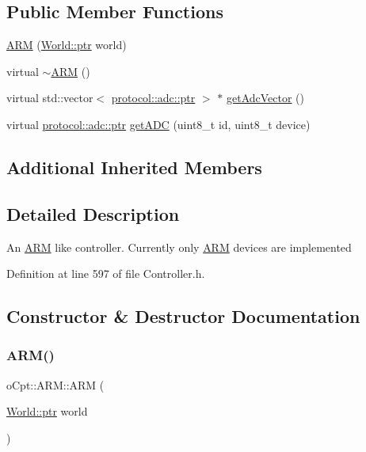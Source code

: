 \subsection*{Public Member Functions}
\begin{DoxyCompactItemize}
\item 
\hyperlink{classo_cpt_1_1_a_r_m_af99c9e575fbee98bf8754220d7a8badd}{A\+RM} (\hyperlink{classo_cpt_1_1_world_aa6e591e3096d5de71e0cec9039663d67}{World\+::ptr} world)
\item 
virtual \hyperlink{classo_cpt_1_1_a_r_m_a2be59dd26648e2a21c3996bcc3b2b153}{$\sim$\+A\+RM} ()
\item 
virtual std\+::vector$<$ \hyperlink{classo_cpt_1_1protocol_1_1adc_a94af68cb9c573629a4a1a16f8ebd3dff}{protocol\+::adc\+::ptr} $>$ $\ast$ \hyperlink{classo_cpt_1_1_a_r_m_a32e77e29e34f3114f0b766b705366ba8}{get\+Adc\+Vector} ()
\item 
virtual \hyperlink{classo_cpt_1_1protocol_1_1adc_a94af68cb9c573629a4a1a16f8ebd3dff}{protocol\+::adc\+::ptr} \hyperlink{classo_cpt_1_1_a_r_m_a2f773bcd04719d81994af8930ca974bd}{get\+A\+DC} (uint8\+\_\+t id, uint8\+\_\+t device)
\end{DoxyCompactItemize}
\subsection*{Additional Inherited Members}


\subsection{Detailed Description}
An \hyperlink{classo_cpt_1_1_a_r_m}{A\+RM} like controller. Currently only \hyperlink{classo_cpt_1_1_a_r_m}{A\+RM} devices are implemented 

Definition at line 597 of file Controller.\+h.



\subsection{Constructor \& Destructor Documentation}
\hypertarget{classo_cpt_1_1_a_r_m_af99c9e575fbee98bf8754220d7a8badd}{}\label{classo_cpt_1_1_a_r_m_af99c9e575fbee98bf8754220d7a8badd} 
\subsubsection{\texorpdfstring{A\+R\+M()}{ARM()}}
{\footnotesize\ttfamily o\+Cpt\+::\+A\+R\+M\+::\+A\+RM (\begin{DoxyParamCaption}\item[{\hyperlink{classo_cpt_1_1_world_aa6e591e3096d5de71e0cec9039663d67}{World\+::ptr}}]{world }\end{DoxyParamCaption})}

